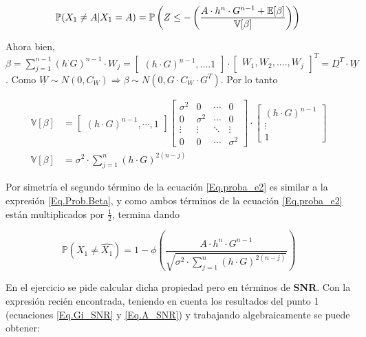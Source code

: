 			\begin{equation}
				\mathbb{P}(X_1 \neq A | X_1 = A) = \mathbb{P} \left( Z\leq - \left(\frac{A \cdot h^n \cdot G^{n-1} + \mathbb{E}[\beta]}{\mathbb{V}[\beta]} \right) \right)
				\label{Eq.Prob.Beta} \\
			\end{equation}

\indent Ahora bien, $\beta = \sum_{j=1}^{n-1} (h ^\cdot G)^{n-1} \cdot W_j = \begin{bmatrix} (h \cdot G)^{n-1}, .... 1 \end{bmatrix} \cdot \begin{bmatrix} W_1, W_2, ...., W_j \end{bmatrix} ^T = \underline{D^T} \cdot \underline{W}$. Como $\underline{W} \sim N(0,C_W) \Rightarrow \beta \sim N(0, G \cdot C_W \cdot G^T)$. Por lo tanto

				\begin{align*}
				\mathbb{V}[\beta] &= \begin{bmatrix} (h \cdot G)^{n-1}, \cdots ,1 \end{bmatrix} \begin{bmatrix} \sigma ^2 & 0 & \cdots & 0 \\ 0 & \sigma ^2 & \cdots & 0 \\ \vdots & \vdots & \ddots & \vdots \\ 0 & 0 & \cdots & \sigma ^2\end{bmatrix} \cdot \begin{bmatrix} (h \cdot G)^{n-1}\\ \vdots \\ 1 \end{bmatrix} \\
				\mathbb{V}[\beta] &= \sigma ^2 \cdot \sum_{j=1}^{n}(h \cdot G)^{2(n-j)}
				\end{align*}

\indent Por simetría el segundo término de la ecuación \ref{Eq.proba_e2} es similar a la expresión \ref{Eq.Prob.Beta}, y como ambos términos de la ecuación \ref{Eq.proba_e2} están multiplicados por $\frac{1}{2}$, termina dando

				\begin{equation}
				\mathbb{P}(X_1 \neq \widehat{X_1}) = 1 - \phi \left( \frac{A \cdot h^n \cdot G^{n-1}}{\sqrt{\sigma ^2 \cdot \sum_{j=1}^{n} (h \cdot G)^{2(n-j)}}}	 \right) 
				\end{equation}		

\indent En el ejercicio se pide calcular dicha propiedad pero en términos de \textbf{SNR}. Con la expresión recién encontrada, teniendo en cuenta los resultados del punto 1 (ecuaciones \ref{Eq.Gi_SNR} y \ref{Eq.A_SNR}) y trabajando algebraicamente se puede obtener:

